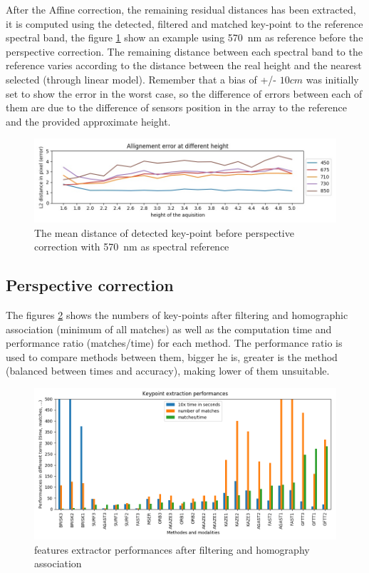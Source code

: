 \documentclass[]{elsarticle}
\begin{document}
	After the Affine correction, the remaining residual distances has been extracted,
	it is computed using the detected, filtered and matched key-point to the reference spectral band,
	the figure \ref{fig:affine-error} show an example using \SI{570}{\nano\meter} as reference before the perspective correction.
	The remaining distance between each spectral band to the reference varies according to the distance between
	the real height and the nearest selected (through linear model).
	Remember that a bias of +/- $10cm$ was initially set to show the error in the worst case,
	so the difference of errors between each of them are due to the difference of sensors position in the array to the reference and the provided approximate height.
	
	\begin{figure}[H]
	\centering
		\includegraphics[width=0.8\linewidth]{../figures/affine-allignement-rmse.jpg}
		\caption{The mean distance of detected key-point before perspective correction with \SI{570}{\nano\meter} as spectral reference}
		\label{fig:affine-error}
	\end{figure}

	
	
	\subsection{Perspective correction}
	
	The figures \ref{fig:features-performances} shows the numbers of key-points after filtering and homographic association (minimum of all matches)
	as well as the computation time and performance ratio (matches/time) for each method.
	The performance ratio is used to compare methods between them, bigger he is,
	greater is the method (balanced between times and accuracy), making lower of them unsuitable.
	
	\begin{figure}[H]
		\centering
		\includegraphics[width=0.9\linewidth]{../figures/comparaison-keypoint-performances.png}
		\caption{features extractor performances after filtering and homography association}
		\label{fig:features-performances}
	\end{figure}
	
\end{document}
